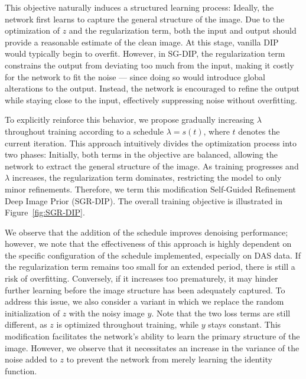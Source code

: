 This objective naturally induces a structured learning process:
Ideally, the network first learns to capture the general structure of the image.
Due to the optimization of $z$ and the regularization term, both the input and output should provide a reasonable estimate of the clean image.
At this stage, vanilla DIP would typically begin to overfit.
However, in SG-DIP, the regularization term constrains the output from deviating too much from the input, making it costly for the network to fit the noise --- since doing so would introduce global alterations to the output.
Instead, the network is encouraged to refine the output while staying close to the input, effectively suppressing noise without overfitting.

To explicitly reinforce this behavior, we propose gradually increasing $\lambda$ throughout training according to a schedule $\lambda = s(t)$, where $t$ denotes the current iteration.
This approach intuitively divides the optimization process into two phases:
Initially, both terms in the objective are balanced, allowing the network to extract the general structure of the image. As training progresses and $\lambda$ increases, the regularization term dominates, restricting the model to only minor refinements.
Therefore, we term this modification Self-Guided Refinement Deep Image Prior (SGR-DIP).
The overall training objective is illustrated in Figure~\ref{fig:SGR-DIP}.

We observe that the addition of the schedule improves denoising performance; however, we note that the effectiveness of this approach is highly dependent on the specific configuration of the schedule implemented, especially on DAS data.
If the regularization term remains too small for an extended period, there is still a risk of overfitting.
Conversely, if it increases too prematurely, it may hinder further learning before the image structure has been adequately captured.
To address this issue, we also consider a variant in which we replace the random initialization of $z$ with the noisy image $y$.
Note that the two loss terms are still different, as $z$ is optimized throughout training, while $y$ stays constant.
This modification facilitates the network's ability to learn the primary structure of the image. 
However, we observe that it necessitates an increase in the variance of the noise added to $z$ to prevent the network from merely learning the identity function.

